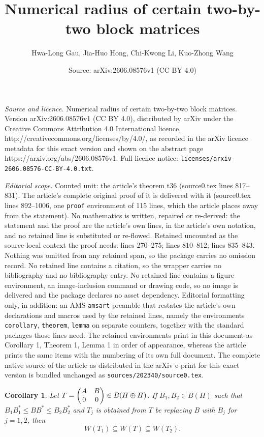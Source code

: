 \documentclass[10pt,a4paper]{amsart}
\title{Numerical radius of certain two-by-two block matrices}
\author{Hwa-Long Gau, Jia-Huo Hong, Chi-Kwong Li, Kuo-Zhong Wang}
\date{Source: arXiv:2606.08576v1 (CC BY 4.0)}
\newtheorem{corollary}{Corollary}
\begin{document}
\maketitle

\noindent\emph{Source and licence.} Numerical radius of certain two-by-two block matrices. Version arXiv:2606.08576v1 (CC BY 4.0), distributed by arXiv under the Creative Commons Attribution 4.0 International licence, http://creativecommons.org/licenses/by/4.0/, as recorded in the arXiv licence metadata for this exact version and shown on the abstract page https://arxiv.org/abs/2606.08576v1. Full licence notice: \texttt{licenses/arxiv-2606.08576-CC-BY-4.0.txt}.\par\smallskip

\noindent\textit{Editorial scope.} Counted unit: the article's theorem t36 (source0.tex lines 817--831). The article's complete original proof of it is delivered with it (source0.tex lines 892--1006, one \texttt{proof} environment of 115 lines, which the article places away from the statement). No mathematics is written, repaired or re-derived: the statement and the proof are the article's own lines, in the article's own notation, and no retained line is substituted or re-flowed.  Retained uncounted as the source-local context the proof needs: lines 270--275; lines 810--812; lines 835--843.  Nothing was omitted from any retained span, so the package carries no omission record.  No retained line contains a citation, so the wrapper carries no bibliography and no bibliography entry.  No retained line contains a figure environment, an image-inclusion command or drawing code, so no image is delivered and the package declares no asset dependency.  Editorial formatting only, in addition: an AMS \texttt{amsart} preamble that restates the article's own declarations and macros used by the retained lines, namely the environments \texttt{corollary}, \texttt{theorem}, \texttt{lemma} on separate counters, together with the standard packages those lines need.  The retained environments print in this document as Corollary 1, Theorem 1, Lemma 1 in order of appearance, whereas the article prints the same items with the numbering of its own full document.  The complete native source of the article as distributed in the arXiv e-print for this exact version is bundled unchanged as \texttt{sources/202340/source0.tex}.
\begin{corollary} \label{2.4} Let
$T = \begin{pmatrix} A & B \cr 0 & 0 \cr\end{pmatrix} \in B(H \oplus H)$.
If $B_1, B_2\in B(H)$ such that $B_1B_1^* \le BB^* \le B_2B_2^*$ and $T_j$ is obtained
from $T$ be replacing $B$ with $B_j$ for $j = 1,2$, then
$$W(T_1) \subseteq W(T) \subseteq W(T_2).$$
\end{corollary}
\end{document}
